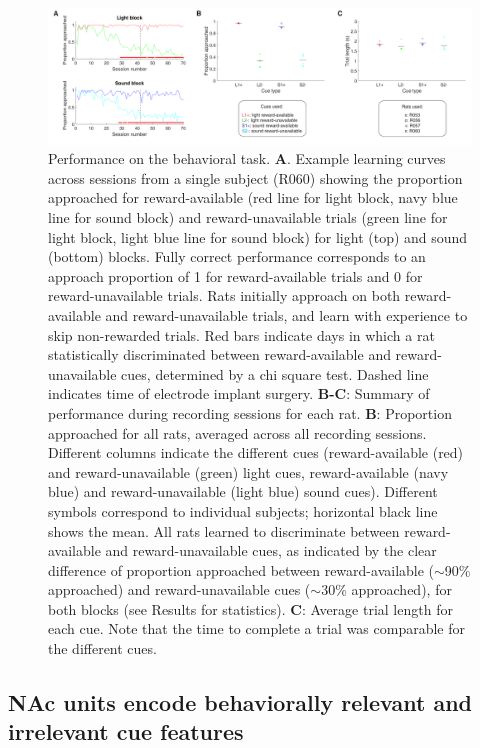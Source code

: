 \documentclass[11pt]{article}
\newcommand{\bsf}[1]{\textbf{#1}}
\begin{document}
 \begin{figure}[ht!]
\centering
\includegraphics[width=\textwidth]{Fig 4 - Behavioral results.pdf}
\caption{Performance on the behavioral task. \bsf{A}. Example learning curves
across sessions from a single subject (R060) showing the proportion approached
for reward-available (red line for light block, navy blue line for sound
block) and reward-unavailable trials (green line for light block, light blue
line for sound block) for light (top) and sound (bottom) blocks. Fully correct performance corresponds to an approach
proportion of 1 for reward-available trials and 0 for reward-unavailable
trials. Rats initially approach on both reward-available and
reward-unavailable trials, and learn with experience to skip non-rewarded
trials. Red bars indicate days in which a rat statistically discriminated
between reward-available and reward-unavailable cues, determined by a chi
square test. Dashed line indicates time of electrode implant
surgery. \bsf{B-C}: Summary of performance during recording sessions for each
rat. \bsf{B}: Proportion approached for all rats, averaged across all
recording sessions. Different columns indicate the different cues
(reward-available (red) and reward-unavailable (green) light cues,
reward-available (navy blue) and reward-unavailable (light blue) sound
cues). Different symbols correspond to individual subjects; horizontal black
line shows the mean. All rats learned to discriminate between reward-available
and reward-unavailable cues, as indicated by the clear difference of
proportion approached between reward-available ($\sim$90\% approached) and
reward-unavailable cues ($\sim$30\% approached), for both blocks (see Results
for statistics). \bsf{C}: Average trial length for each cue. Note that the
time to complete a trial was comparable for the different cues.}
\label{fig:behav}
\end{figure} \clearpage

\subsection*{NAc units encode behaviorally relevant and irrelevant cue features}
\end{document}
